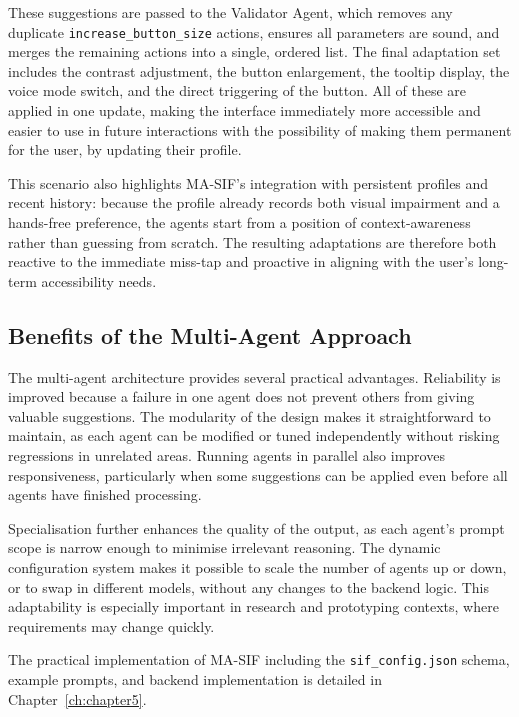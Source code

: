 These suggestions are passed to the Validator Agent, which removes any duplicate \texttt{increase\_button\_size} actions, ensures all parameters are sound, and merges the remaining actions into a single, ordered list. The final adaptation set includes the contrast adjustment, the button enlargement, the tooltip display, the voice mode switch, and the direct triggering of the button. All of these are applied in one update, making the interface immediately more accessible and easier to use in future interactions with the possibility of making them permanent for the user, by updating their profile.

This scenario also highlights MA-SIF’s integration with persistent profiles and recent history: because the profile already records both visual impairment and a hands-free preference, the agents start from a position of context-awareness rather than guessing from scratch. The resulting adaptations are therefore both reactive to the immediate miss-tap and proactive in aligning with the user’s long-term accessibility needs.

\subsection{Benefits of the Multi-Agent Approach}
The multi-agent architecture provides several practical advantages. Reliability is improved because a failure in one agent does not prevent others from giving valuable suggestions. The modularity of the design makes it straightforward to maintain, as each agent can be modified or tuned independently without risking regressions in unrelated areas. Running agents in parallel also improves responsiveness, particularly when some suggestions can be applied even before all agents have finished processing.

Specialisation further enhances the quality of the output, as each agent’s prompt scope is narrow enough to minimise irrelevant reasoning. The dynamic configuration system makes it possible to scale the number of agents up or down, or to swap in different models, without any changes to the backend logic. This adaptability is especially important in research and prototyping contexts, where requirements may change quickly.

The practical implementation of MA-SIF including the \texttt{sif\_config.json} schema, example prompts, and backend implementation is detailed in Chapter~\ref{ch:chapter5}.

